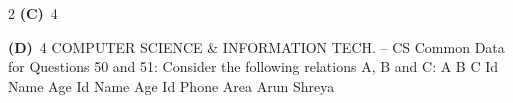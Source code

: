 \documentclass[a4paper,10pt,twoside]{article}
\begin{document}
\begin{multicols}{2}
\textbf{(C)}~4     \par\vspace{2pt}\noindent
\textbf{(D)}~4       COMPUTER SCIENCE \& INFORMATION TECH. -- CS \newline  \newline Common Data for Questions 50 and 51: \newline  \newline Consider the following relations A, B and C: \newline  \newline A B C \newline Id \newline Name \newline Age \newline  \newline Id \newline Name \newline Age \newline  \newline Id \newline Phone \newline Area  \newline Arun  \newline  {} \newline Shreya  \newline  {}  \new
\end{multicols}
\end{document}
